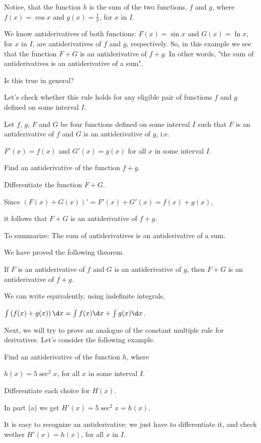 \documentclass{ximera}
\begin{document}
Notice, that the function $h$ is the sum of the two functions, $f$ and $g$, where $f(x)=\cos{x}$ and $g(x)=\frac{1}{x}$, for $x$ in $I$.

We know antiderivatives of both functions:  $F(x)=\sin{x}$ and $G(x)=\ln{x}$,  for $x$ in $I$, are antiderivatives of $f$ and $g$, respectively.
So, in this example we see that the function  $F+G$ is an antiderivative of $f+g$.
In other words, "the sum of antiderivatives is an antiderivative of a sum".

Is this true in general? 

Let's check whether this rule holds for any eligible pair of functions $f$ and $g$ defined on some interval $I$.
 \begin{question}
Let $f$, $g$, $F$ and $G$ be four functions defined on some interval $I$ such that $F$ is an antiderivative of $f$ and $G$ is an antiderivative of $g$, i.e.

$F'(x)=f(x)$ and $G'(x)=g(x)$ for all $x$ in some interval $I$.

  Find an antiderivative of the function $f+g$.
    \begin{hint}
    Differentiate the function $F+G$.
     \end{hint}
     Since
     $\left(F(x)+G(x)\right)'=F'(x)+G'(x)=f(x)+g(x)$,
     
     
   it follows that  $F+G$ is an antiderivative of $f+g$. 
 
 To summarize: The sum of antiderivatives is an antiderivative of a sum. 
\end{question}
We have proved the following theorem.
\begin{theorem}\label{theorem:SRA}
If $F$ is an antiderivative of $f$ and $G$ is an antiderivative of
$g$, then $F+G$ is an antiderivative of $f+g$.

We can write equivalently, using indefinite integrals, 

$\int \left(f(x)+g(x)\right) \d x= \int f(x)\d x +\int g(x) \d x$.
\end{theorem}

Next, we will try to prove an analogue of the constant multiple rule for derivatives.
Let's consider the following example.
\begin{example}
  Find  an antiderivative of the function $h$, where
  
   $h(x)=5\sec^{2}{x}$,  for all $x$ in some interval $I$.
  \begin{multipleChoice}
  \end{multipleChoice}
  \begin{feedback}
    Differentiate each choice for $H(x)$.
    
     In part (a) we get $H'(x)=5\sec^{2}{x}=h(x)$.
  \end{feedback}
\end{example}
It is easy to recognize an antiderivative: we just have to differentiate it, and check wether $H'(x)=h(x)$, for all $x$ in $I$.
\end{document}
